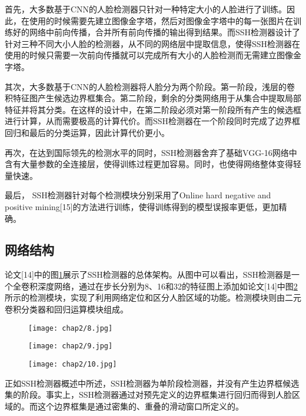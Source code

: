 首先，大多数基于CNN的人脸检测器只针对一种特定大小的人脸进行了训练。因此，在使用的时候需要先建立图像金字塔，然后对图像金字塔中的每一张图片在训练好的网络中前向传播，合并所有前向传播的输出得到结果。而SSH检测器设计了针对三种不同大小人脸的检测器，从不同的网络层中提取信息，使得SSH检测器在使用的时候只需要一次前向传播就可以完成所有大小的人脸检测而无需建立图像金字塔。

其次，大多数基于CNN的人脸检测器将人脸分为两个阶段。第一阶段，浅层的卷积特征图产生候选边界框集合。第二阶段，剩余的分类网络用于从集合中提取局部特征并将其分类。在这样的设计中，在第二阶段必须对第一阶段所有产生的候选框进行计算，从而需要极高的计算代价。而SSH检测器在一个阶段同时完成了边界框回归和最后的分类运算，因此计算代价更小。

再次，在达到国际领先的检测水平的同时，SSH检测器舍弃了基础VGG-16网络中含有大量参数的全连接层，使得训练过程更加容易。同时，也使得网络整体变得轻量快速。

最后， SSH检测器针对每个检测模块分别采用了Online hard negative and positive mining[15]的方法进行训练，使得训练得到的模型误报率更低，更加精确。

\subsection{网络结构}

论文[14]中的图\ref{fig:ssh:arc}展示了SSH检测器的总体架构。从图中可以看出，SSH检测器是一个全卷积深度网络，通过在步长分别为8、16和32的特征图上添加如论文[14]中图\ref{fig:ssh:det}所示的检测模块，实现了利用网络定位和区分人脸区域的功能。检测模块则由二元卷积分类器和回归运算模块组成。

\begin{figure}[!htp]
	\centering
	\texttt{[image: chap2/8.jpg]}
	\label{fig:ssh:arc}
\end{figure}

\begin{figure}[!htp]
	\centering
	\texttt{[image: chap2/9.jpg]}
	\label{fig:ssh:det}
\end{figure}

\begin{figure}[!htp]
	\centering
	\texttt{[image: chap2/10.jpg]}
	\label{fig:ssh:context}
\end{figure}

正如SSH检测器概述中所述，SSH检测器为单阶段检测器，并没有产生边界框候选集的阶段。事实上，SSH检测器通过对预先定义的边界框集进行回归而得到人脸区域的。而这个边界框集是通过密集的、重叠的滑动窗口所定义的。

